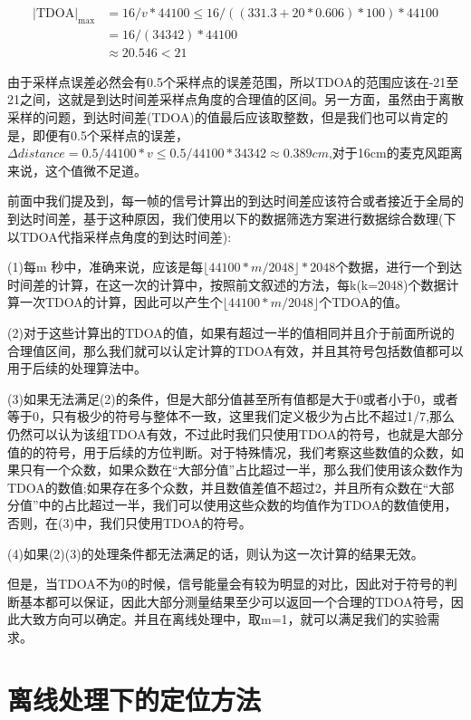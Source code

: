 \documentclass[winfonts]{njuthesis}
\begin{document}
		\begin{align}
			|\text{TDOA}|_{\text{max}} & = 16 / v * 44100 \leq 16 / ((331.3 + 20 * 0.606) * 100) * 44100  \\
									   & = 16 / (34342) * 44100\\
									   & \approx 20.546 < 21
		\end{align}
		
		由于采样点误差必然会有0.5个采样点的误差范围，所以TDOA的范围应该在-21至21之间，这就是到达时间差采样点角度的合理值的区间。另一方面，虽然由于离散采样的问题，到达时间差(TDOA)的值最后应该取整数，但是我们也可以肯定的是，即便有0.5个采样点的误差，$\Delta distance = 0.5 / 44100 * v \leq 0.5 / 44100 * 34342 \approx 0.389cm$,对于16cm的麦克风距离来说，这个值微不足道。
		
		前面中我们提及到，每一帧的信号计算出的到达时间差应该符合或者接近于全局的到达时间差，基于这种原因，我们使用以下的数据筛选方案进行数据综合数理(下以TDOA代指采样点角度的到达时间差):
		
		(1)每m 秒中，准确来说，应该是每$\lfloor 44100 * m / 2048 \rfloor * 2048 $个数据，进行一个到达时间差的计算，在这一次的计算中，按照前文叙述的方法，每k(k=2048)个数据计算一次TDOA的计算，因此可以产生个$\lfloor 44100 * m / 2048 \rfloor$个TDOA的值。
		
		(2)对于这些计算出的TDOA的值，如果有超过一半的值相同并且介于前面所说的合理值区间，那么我们就可以认定计算的TDOA有效，并且其符号包括数值都可以用于后续的处理算法中。
		
		(3)如果无法满足(2)的条件，但是大部分值甚至所有值都是大于0或者小于0，或者等于0，只有极少的符号与整体不一致，这里我们定义极少为占比不超过1/7,那么仍然可以认为该组TDOA有效，不过此时我们只使用TDOA的符号，也就是大部分值的的符号，用于后续的方位判断。对于特殊情况，我们考察这些数值的众数，如果只有一个众数，如果众数在“大部分值”占比超过一半，那么我们使用该众数作为TDOA的数值;如果存在多个众数，并且数值差值不超过2，并且所有众数在“大部分值”中的占比超过一半，我们可以使用这些众数的均值作为TDOA的数值使用，否则，在(3)中，我们只使用TDOA的符号。
		
		(4)如果(2)(3)的处理条件都无法满足的话，则认为这一次计算的结果无效。
		
		但是，当TDOA不为0的时候，信号能量会有较为明显的对比，因此对于符号的判断基本都可以保证，因此大部分测量结果至少可以返回一个合理的TDOA符号，因此大致方向可以确定。并且在离线处理中，取m=1，就可以满足我们的实验需求。
		
	\section{离线处理下的定位方法}
		
\end{document}
